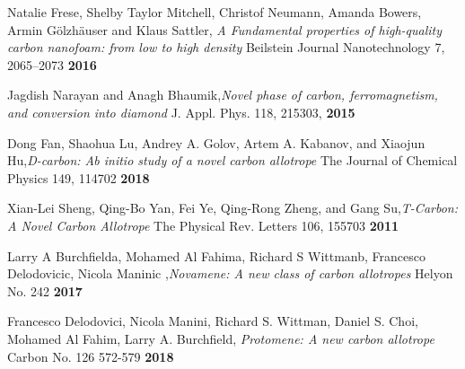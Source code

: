\documentclass[a4paper,titlepage]{book}
\begin{document}
\begin{thebibliography}{99}
Natalie Frese, Shelby Taylor Mitchell, Christof Neumann, Amanda Bowers, Armin Gölzhäuser and Klaus Sattler,
\textit{A Fundamental properties of high-quality carbon nanofoam: from low to high density } Beilstein Journal Nanotechnology 7, 2065–2073  \textbf{2016}

Jagdish Narayan and Anagh Bhaumik,\textit{Novel phase of carbon, ferromagnetism, and conversion into diamond} J. Appl. Phys. 118, 215303,  \textbf{2015}

Dong Fan, Shaohua Lu, Andrey A. Golov, Artem A. Kabanov, and Xiaojun Hu,\textit{D-carbon: Ab initio study of a novel carbon allotrope} The Journal of Chemical Physics 149, 114702  \textbf{2018}

Xian-Lei Sheng, Qing-Bo Yan, Fei Ye, Qing-Rong Zheng, and Gang Su,\textit{T-Carbon: A Novel Carbon Allotrope} The Physical Rev. Letters 106, 155703  \textbf{2011}

Larry A Burchfielda, Mohamed Al Fahima, Richard S Wittmanb, Francesco Delodovicic, Nicola Maninic ,\textit{Novamene: A new class of carbon allotropes} Helyon No. 242  \textbf{2017}

Francesco Delodovici, Nicola Manini, Richard S. Wittman, Daniel S. Choi, Mohamed Al Fahim, Larry A. Burchfield, \textit{Protomene: A new carbon allotrope} Carbon  No. 126 572-579 \textbf{2018}
\end{thebibliography}
\end{document}
